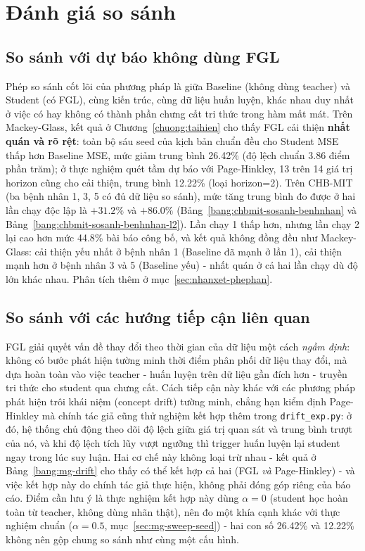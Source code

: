 \chapter{Đánh giá so sánh}
\label{chuong:sosanh}

\section{So sánh với dự báo không dùng FGL}

Phép so sánh cốt lõi của phương pháp là giữa Baseline (không dùng teacher) và Student (có FGL),
cùng kiến trúc, cùng dữ liệu huấn luyện, khác nhau duy nhất ở việc có hay không có thành phần
chưng cất tri thức trong hàm mất mát. Trên Mackey-Glass, kết quả ở
Chương~\ref{chuong:taihien} cho thấy FGL cải thiện \textbf{nhất quán và rõ rệt}: toàn bộ sáu
seed của kịch bản chuẩn đều cho Student MSE thấp hơn Baseline MSE, mức giảm trung bình
26.42\% (độ lệch chuẩn 3.86 điểm phần trăm); ở thực nghiệm quét tầm dự báo với Page-Hinkley,
13 trên 14 giá trị horizon cũng cho cải thiện, trung bình 12.22\% (loại horizon=2). Trên
CHB-MIT (ba bệnh nhân 1, 3, 5 có đủ dữ liệu so sánh), mức tăng trung bình đo được ở hai lần
chạy độc lập là $+31.2\%$ và $+86.0\%$ (Bảng~\ref{bang:chbmit-sosanh-benhnhan} và
Bảng~\ref{bang:chbmit-sosanh-benhnhan-l2}). Lần chạy 1 thấp hơn, nhưng lần chạy 2 lại cao hơn
mức 44.8\% bài báo công bố, và kết quả không đồng đều như Mackey-Glass: cải thiện yếu nhất ở
bệnh nhân 1 (Baseline đã mạnh ở lần 1), cải
thiện mạnh hơn ở bệnh nhân 3 và 5 (Baseline yếu) - nhất quán ở cả hai lần chạy dù độ lớn khác
nhau. Phân tích thêm ở mục~\ref{sec:nhanxet-phephan}.

\section{So sánh với các hướng tiếp cận liên quan}

FGL giải quyết vấn đề thay đổi theo thời gian của dữ liệu một cách \textit{ngầm định}: không
có bước phát hiện tường minh thời điểm phân phối dữ liệu thay đổi, mà dựa hoàn toàn vào việc
teacher - huấn luyện trên dữ liệu gần đích hơn - truyền tri thức cho student qua chưng cất.
Cách tiếp cận này khác với các phương pháp phát hiện trôi khái niệm (concept drift) tường
minh, chẳng hạn kiểm định Page-Hinkley \cite{page1954cusum} mà chính tác giả cũng thử nghiệm
kết hợp thêm trong \texttt{drift\_exp.py}: ở đó, hệ thống chủ động theo dõi độ lệch giữa giá
trị quan sát và trung bình trượt của nó, và khi độ lệch tích lũy vượt ngưỡng thì trigger huấn
luyện lại student ngay trong lúc suy luận. Hai cơ chế này không loại trừ nhau - kết quả ở
Bảng~\ref{bang:mg-drift} cho thấy có thể kết hợp cả hai (FGL \textit{và} Page-Hinkley) - và
việc kết hợp này do chính tác giả thực hiện, không phải đóng góp riêng của báo cáo. Điểm cần
lưu ý là thực nghiệm kết hợp này dùng $\alpha=0$ (student học hoàn toàn từ teacher, không dùng
nhãn thật), nên đo một khía cạnh khác với thực nghiệm chuẩn ($\alpha=0.5$,
mục~\ref{sec:mg-sweep-seed}) - hai con số 26.42\% và 12.22\% không nên gộp chung so sánh như
cùng một cấu hình.

